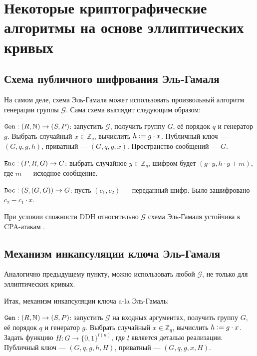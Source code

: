 \documentclass[a4paper,14pt]{extarticle}
\begin{document}
\newpage

\section{Некоторые криптографические алгоритмы на основе эллиптических кривых}

\subsection{Схема публичного шифрования Эль-Гамаля}

На самом деле, схема Эль-Гамаля может использовать произвольный алгоритм
генерации группы $\mathcal{G}$. Сама схема выглядит следующим образом:

\vspace{0.2cm}

$\verb|Gen|: (R, \mathbb{N}) \to (S, P)$: запустить $\mathcal{G}$, получить
группу $G$, её порядок $q$ и генератор $g$. Выбрать случайный
$x \in \mathbb{Z}_q$, вычислить $h \vcentcolon= g \cdot x$. Публичный ключ ---
$(G, q, g, h)$, приватный --- $(G, q, g, x)$. Пространство сообщений --- $G$.

$\verb|Enc|: (P, R, G) \to C$: выбрать случайное $y \in \mathbb{Z}_q$,
шифром будет $(g \cdot y, h \cdot y + m)$, где $m$ --- исходное
сообщение.

$\verb|Dec|: (S, (G, G)) \to G$: пусть $(c_1, c_2)$ --- переданный
шифр. Было зашифровано $c_2 - c_1 \cdot x$.

\vspace{0.2cm}

При условии сложности DDH относительно $\mathcal{G}$ схема Эль-Гамаля устойчива
к CPA-атакам \cite{textbook}.

\subsection{Механизм инкапсуляции ключа Эль-Гамаля}

Аналогично предыдущему пункту, можно использовать любой $\mathcal{G}$, не только
для эллиптических кривых.

Итак, механизм инкапсуляции ключа a-la Эль-Гамаль:

\vspace{0.2cm}

$\verb|Gen|: (R, \mathbb{N}) \to (S, P)$: запустить $\mathcal{G}$ на входных
аргументах, получить группу $G$, её порядок $q$ и генератор $g$. Выбрать
случайный $x \in \mathbb{Z}_q$, вычислить $h \vcentcolon= g \cdot x$. Задать
функцию $H: G \to \{0, 1\}^{l(n)}$, где $l$ является деталью реализации.
Публичный ключ --- $(G, q, g, h, H)$, приватный --- $(G, q, g, x, H)$.
\end{document}
